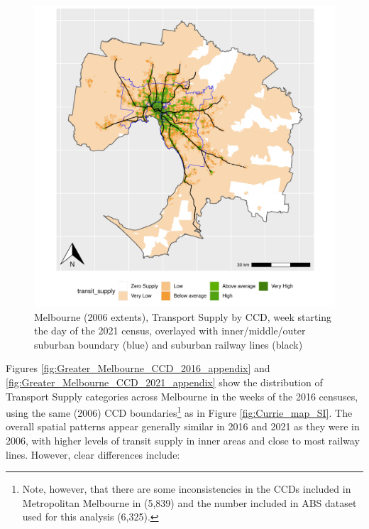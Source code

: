 \documentclass[preprint, 3p,
authoryear]{elsarticle} %
\begin{document}
\begin{figure}
\centering
\includegraphics{ReynoldsCurrieQu2024_files/figure-latex/Greater_Melbourne_CCD_2021_appendix-1.pdf}
\caption{Melbourne (2006 extents), Transport Supply by CCD, week
starting the day of the 2021 census, overlayed with inner/middle/outer
suburban boundary (blue) and suburban railway lines (black)}
\end{figure}

Figures \ref{fig:Greater_Melbourne_CCD_2016_appendix} and
\ref{fig:Greater_Melbourne_CCD_2021_appendix} show the distribution of
Transport Supply categories across Melbourne in the weeks of the 2016
censuses, using the same (2006) CCD boundaries\footnote{Note, however,
  that there are some inconsistencies in the CCDs included in
  Metropolitan Melbourne in \citet{currie2010identifying} (5,839) and
  the number included in ABS dataset used for this analysis (6,325).} as
in Figure \ref{fig:Currie_map_SI}. The overall spatial patterns appear
generally similar in 2016 and 2021 as they were in 2006, with higher
levels of transit supply in inner areas and close to most railway lines.
However, clear differences include:
\end{document}
